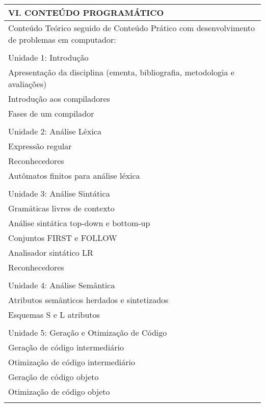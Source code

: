 \documentclass[12pt]{article}
\begin{document}
\begin{longtable}{|L{1.025\textwidth}|} \hline
%
{\bf VI. CONTEÚDO PROGRAMÁTICO } \\ \hline
Conteúdo Teórico seguido de Conteúdo Prático com desenvolvimento de problemas em computador:\\
\\
Unidade 1: Introdução\\
Apresentação da disciplina (ementa, bibliografia, metodologia e avaliações)\\
Introdução aos compiladores\\
Fases de um compilador\\
\\
Unidade 2: Análise Léxica\\
Expressão regular\\
Reconhecedores\\
Autômatos finitos para análise léxica\\
\\
Unidade 3: Análise Sintática\\
Gramáticas livres de contexto\\
Análise sintática top-down e bottom-up\\
Conjuntos FIRST e FOLLOW\\
Analisador sintático LR\\
Reconhecedores\\
\\
Unidade 4: Análise Semântica\\
Atributos semânticos herdados e sintetizados\\
Esquemas S e L atributos\\
\\
Unidade 5: Geração e Otimização de Código\\
Geração de código intermediário\\
Otimização de código intermediário\\
Geração de código objeto\\
Otimização de código objeto\\
\\ \hline
\end{longtable} 

\end{document}
